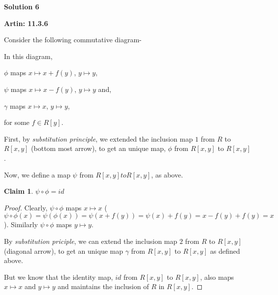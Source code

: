 \documentclass[12pt,a4paper]{article}
\newtheorem{claim}[theorem]{Claim}
\theoremstyle{definition}
\begin{document}
\begin{flushleft}
\bigskip

{\bf Solution 6}

\medskip

{\bf Artin: 11.3.6}

Consider the following commutative diagram-



\medskip

In this diagram, 

$\phi$ maps $x \mapsto x + f(y)$, $y \mapsto y$,

$\psi$ maps $x \mapsto x - f(y)$, $y \mapsto y$ and,

$\gamma$ maps $x \mapsto x$, $y \mapsto y$,

for some $f \in R[y]$.

\medskip

First, by {\it substitution principle}, we extended the inclusion map $1$ from $R$ to $R[x,y]$ (bottom most arrow), to get an unique map, $\phi$ from $R[x,y]$ to $R[x,y]$.

\medskip

Now, we define a map $\psi$ from $R[x,y] to R[x,y]$, as above.

\begin{claim}
	$\psi \circ \phi = id$
\end{claim}

\begin{proof}
	Clearly, $\psi \circ \phi$ maps $x \mapsto x$ ($\psi \circ \phi (x) = \psi (\phi (x)) = \psi (x + f(y)) = \psi(x) + f(y) = x - f(y) + f(y) = x$). Similarly $\psi \circ \phi$ maps $y \mapsto y$.

	\medskip

	By {\it substitution priciple}, we can extend the inclusion map $2$ from $R$ to $R[x,y]$ (diagonal arrow), to get an unique map $\gamma$ from $R[x,y]$ to $R[x,y]$ as defined above.

	\medskip

	But we know that the identity map, $id$ from $R[x,y]$ to $R[x,y]$, also maps $x \mapsto x$ and $y \mapsto y$ and maintains the inclusion of $R$ in $R[x,y]$.


\end{proof}
\end{flushleft}
\end{document}

